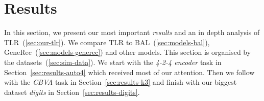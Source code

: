

\section{Results} 
\label{sec:results} 

In this section, we present our most important \emph{results} and an in depth analysis of TLR~(\ref{sec:our-tlr}). We compare TLR to BAL~(\ref{sec:models-bal}), GeneRec~(\ref{sec:models-generec}) and other models. This section is organised by the datasets~(\ref{sec:sim-data}). We start with the \emph{4-2-4 encoder} task in Section~\ref{sec:results-auto4} which received most of our attention. Then we follow with the \emph{CBVA} task in Section~\ref{sec:results-k3} and finish with our biggest dataset \emph{digits} in Section~\ref{sec:results-digits}. 

 

 

 

